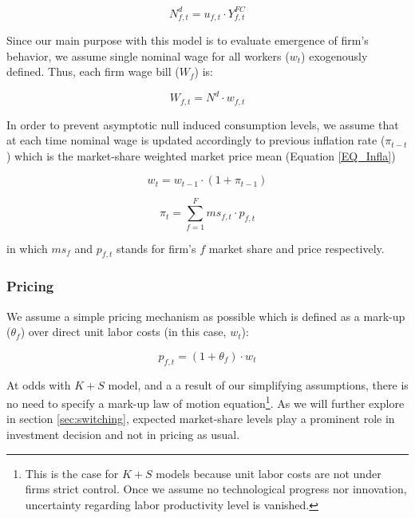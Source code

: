 \documentclass{SelfArx}
\begin{document}
\begin{latex}
\begin{equation}
N^{d}_{f,t} = u_{f,t}\cdot Y^{FC}_{f,t}
\end{equation}
\end{latex}

Since our main purpose with this model is to evaluate emergence of firm's behavior, we assume single nominal wage for all workers (\(w_{t}\)) exogenously defined.
Thus, each firm wage bill (\(W_{f}\)) is:
\begin{latex}
\begin{equation}
W_{f,t} = N^{d}\cdot w_{f,t}
\end{equation}
\end{latex}
In order to prevent asymptotic null induced consumption levels, we assume that at each time nominal wage is updated accordingly to previous inflation rate (\(\pi_{t-t}\)) which is the market-share weighted market price mean (Equation \ref{EQ_Infla})

\begin{latex}
\begin{equation}
w_{t} = w_{t-1}\cdot(1+\pi_{t-1})
\end{equation}
\end{latex}
\begin{latex}
\begin{equation}
\label{Ch_super_EQ_Infla}
\pi_{t} = \sum_{f=1}^{F} ms_{f,t}\cdot p_{f,t}
\end{equation}
\end{latex}
in which \(ms_{f}\) and \(p_{f,t}\) stands for firm's \(f\) market share and price respectively.



\subsubsection{Pricing}
\label{sec:org90fb905}

We assume a simple pricing mechanism as possible which is defined as a mark-up (\(\theta_{f}\)) over direct unit labor costs (in this case, \(w_{t}\)):
\begin{latex}
\begin{equation}
p_{f,t} = (1+\theta_{f})\cdot w_{t}
\end{equation}
\end{latex}
At odds with \(K+S\) model, and a a result of our simplifying assumptions, there is no need to specify a mark-up law of motion equation\footnote{This is the case for \(K+S\) models because unit labor costs are not under firms strict control. Once we assume no technological progress nor innovation, uncertainty regarding labor productivity level is vanished.}.
As we will further explore in section \ref{sec:switching}, expected market-share levels play a prominent role in investment decision and not in pricing as usual.
\end{document}
